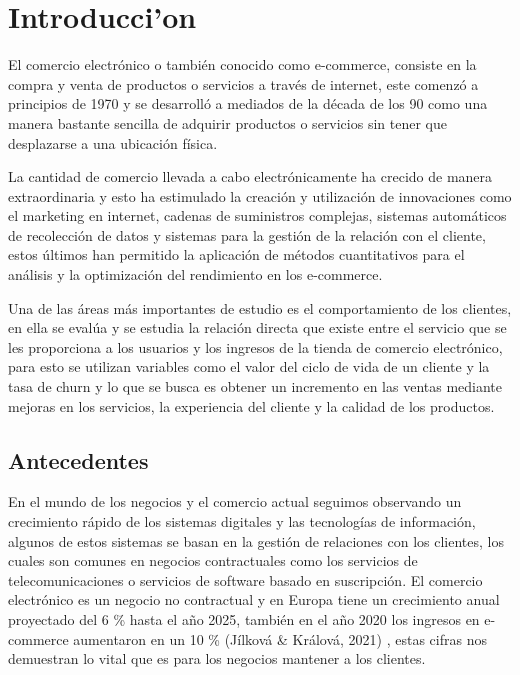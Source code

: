 
\chapter{Introducci'on}

El comercio electrónico o también conocido como e-commerce, consiste en la compra y venta de productos o servicios a través de internet, este comenzó a principios de 1970 y se desarrolló a mediados de la década de los 90 como una manera bastante sencilla de adquirir productos o servicios sin tener que desplazarse a una ubicación física.


La cantidad de comercio llevada a cabo electrónicamente ha crecido de manera extraordinaria y esto ha estimulado la creación y utilización de innovaciones como el marketing en internet, cadenas de suministros complejas, sistemas automáticos de recolección de datos y sistemas para la gestión de la relación con el cliente, estos últimos han permitido la aplicación de métodos cuantitativos para el análisis y la optimización del rendimiento en los e-commerce.


Una de las áreas más importantes de estudio es el comportamiento de los clientes, en ella se evalúa y se estudia la relación directa que existe entre el servicio que se les proporciona a los usuarios y los ingresos de la tienda de comercio electrónico, para esto se utilizan variables como el valor del ciclo de vida de un cliente y la tasa de churn y lo que se busca es obtener un incremento en las ventas mediante mejoras en los servicios, la experiencia del cliente y la calidad de los productos.

\section{Antecedentes}

En el mundo de los negocios y el comercio actual seguimos observando un crecimiento rápido de los sistemas digitales y las tecnologías de información, algunos de estos sistemas se basan en la gestión de relaciones con los clientes, los cuales son comunes en negocios contractuales como los servicios de telecomunicaciones o servicios de software basado en suscripción. El comercio electrónico es un negocio no contractual y en Europa tiene un crecimiento anual proyectado del 6 \% hasta el año 2025, también en el año 2020 los ingresos en e-commerce aumentaron en un 10 \% (Jílková \& Králová, 2021) \cite{Jilkova2021}, estas cifras nos demuestran lo vital que es para los negocios mantener a los clientes.


